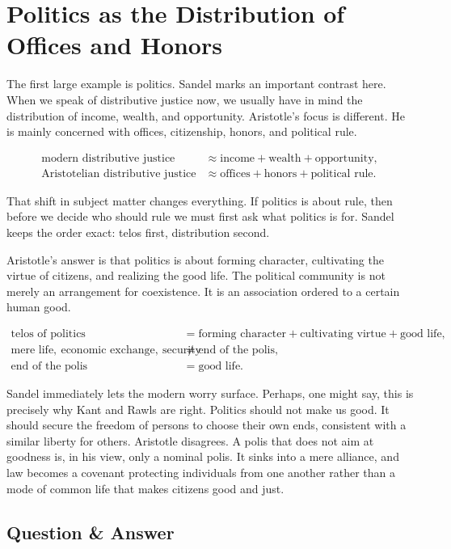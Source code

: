 \section{Politics as the Distribution of Offices and Honors}

The first large example is politics. Sandel marks an important contrast here. When we speak of distributive justice now, we usually have in mind the distribution of income, wealth, and opportunity. Aristotle's focus is different. He is mainly concerned with offices, citizenship, honors, and political rule.

\begin{align}
\text{modern distributive justice}
&\approx
\text{income}+\text{wealth}+\text{opportunity},\\
\text{Aristotelian distributive justice}
&\approx
\text{offices}+\text{honors}+\text{political rule}.
\end{align}

That shift in subject matter changes everything. If politics is about rule, then before we decide who should rule we must first ask what politics is for. Sandel keeps the order exact: telos first, distribution second.

Aristotle's answer is that politics is about forming character, cultivating the virtue of citizens, and realizing the good life. The political community is not merely an arrangement for coexistence. It is an association ordered to a certain human good.

\begin{align}
\text{telos of politics}
&=
\text{forming character}
+\text{cultivating virtue}
+\text{good life},\\
\text{mere life},\ \text{economic exchange},\ \text{security}
&\neq
\text{end of the polis},\\
\text{end of the polis}
&=
\text{good life}.
\end{align}

Sandel immediately lets the modern worry surface. Perhaps, one might say, this is precisely why Kant and Rawls are right. Politics should not make us good. It should secure the freedom of persons to choose their own ends, consistent with a similar liberty for others. Aristotle disagrees. A polis that does not aim at goodness is, in his view, only a nominal polis. It sinks into a mere alliance, and law becomes a covenant protecting individuals from one another rather than a mode of common life that makes citizens good and just.

\subsection{Question \& Answer}

